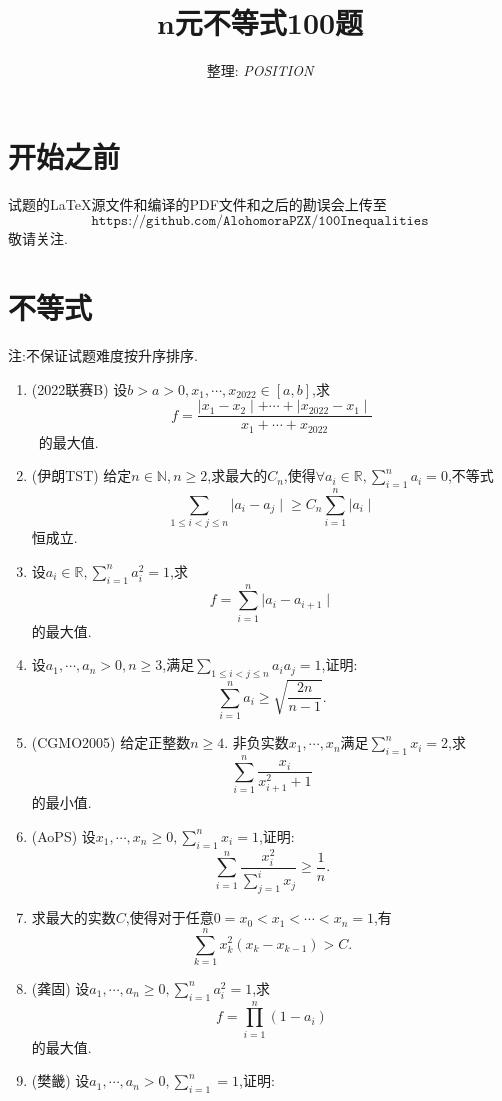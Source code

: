 \documentclass{article}
\title {\zihao{2} \textbf{$\boldsymbol{n}$元不等式100题}}
\author{整理: \emph{POSITION}}
\date{ }
\begin{document}
    \maketitle
\section{开始之前}
    试题的{\LaTeX}源文件和编译的PDF文件和之后的勘误会上传至
    $$\texttt{https://github.com/AlohomoraPZX/100Inequalities}$$敬请关注.

\section{不等式}
   {\fangsong *注:不保证试题难度按升序排序.}
    \begin{enumerate} %
        \item (2022联赛B) 设$b>a>0,x_1,\cdots,x_{2022} \in [a,b]$,求\ 
            $$f=\frac{\mid x_1-x_2 \mid + \cdots + \mid x_{2022} - x_1 \mid}{x_1+\cdots+x_{2022}}$$\
            的最大值.
        \item (伊朗TST) 给定$n\in\mathbb{N},n\ge2$,求最大的$C_n$,使得$\forall a_i\in\mathbb{R},\sum_{i=1}^n{a_i}=0$,不等式 
            $$\sum_{1\le i<j\le n}{\mid a_i - a_j \mid}\ge C_n\sum_{i=1}^n{\mid a_i \mid}$$恒成立.
        \item 设$a_i\in\mathbb{R},\sum_{i=1}^n{a_i^2}=1$,求$$f=\sum_{i=1}^n{\mid a_i - a_{i+1} \mid}$$的最大值.
        \item 设$a_1,\cdots,a_n>0,n\ge3$,满足$\sum_{1\le i<j \le n}{a_i a_j}=1$,证明:\ 
            $$\sum_{i=1}^{n}{a_i}\ge\sqrt{\frac{2n}{n-1}}.$$
        \item (CGMO2005) 给定正整数$n\ge4$. 非负实数$x_1,\cdots,x_n$满足$\sum_{i=1}^n{x_i}=2$,求\
            $$\sum_{i=1}^n{\frac{x_i}{x_{i+1}^2+1}}$$的最小值.
        \item (AoPS) 设$x_1,\cdots,x_n\ge0,\sum_{i=1}^n{x_i}=1$,证明:\ 
            $$\sum_{i=1}^{n}{\frac{x_i^2}{\sum_{j=1}^i{x_j}}}\ge\frac{1}{n}.$$
        \item 求最大的实数$C$,使得对于任意$0=x_0<x_1<\cdots<x_n=1$,有\ 
            $$\sum_{k=1}^n{x_k^2\left( x_k - x_{k-1}\right)} > C.$$
        \item (龚固) 设$a_1,\cdots,a_n\ge0,\sum_{i=1}^n{a_i^2}=1$,求\ 
            $$f=\prod_{i=1}^n{\left( 1-a_i \right)}$$的最大值.
        \item (樊畿) 设$a_1,\cdots,a_n>0,\sum_{i=1}^n=1$,证明:\ 

\end{enumerate}
\end{document}
